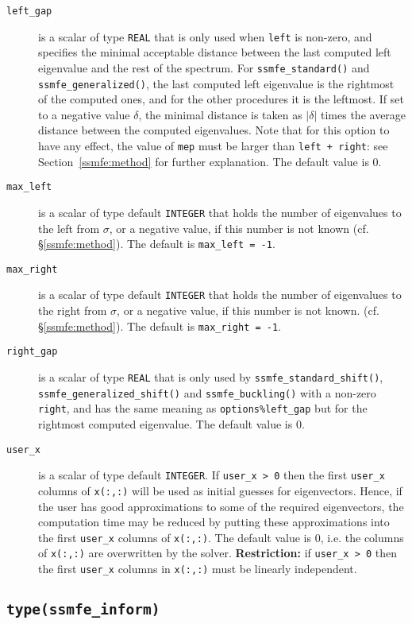 \begin{description}
%
\item[\texttt{left\_gap}]
is a scalar of type \texttt{REAL}
that is only used when
{\tt left} is non-zero, and
specifies the minimal acceptable distance
between the last computed left eigenvalue
and the rest of the spectrum.
For {\tt ssmfe\_standard()} and {\tt ssmfe\_generalized()},
the last computed left eigenvalue
is the rightmost of the computed ones,
and for the other procedures
it is the leftmost.
If set to a negative value $\delta$,
the minimal distance is taken as
$|\delta|$ times the average distance between the computed eigenvalues.
Note that for this option to have any effect,
the value of {\tt mep} must be larger than
{\tt left + right}: see Section~\ref{ssmfe:method}
for further explanation.
The default value is 0.
%
\item[\texttt{max\_left}]
is a scalar of type default \texttt{INTEGER} that
holds the number of eigenvalues to the left from $\sigma$,
or a negative value, if this number is not known
(cf. \S\ref{ssmfe:method}).
The default is {\tt max\_left = -1}.
%
\item[\texttt{max\_right}]
is a scalar of type default \texttt{INTEGER} that
holds the number of eigenvalues to the right from $\sigma$,
or a negative value, if this number is not known.
(cf. \S\ref{ssmfe:method}).
The default is {\tt max\_right = -1}.
%
\item[\texttt{right\_gap}]
is a scalar of type \texttt{REAL}
that is only used by 
{\tt ssmfe\_standard\_shift()}, {\tt ssmfe\_generalized\_shift()}
and {\tt ssmfe\_buckling()}
with a non-zero {\tt right}, and
has the same meaning as {\tt options\%left\_gap}
but for the rightmost computed eigenvalue.
The default value is 0.
%
\item[\texttt{user\_x}] is a scalar of type default \texttt{INTEGER}. 
If {\tt user\_x > 0} then the first {\tt user\_x} columns
of {\tt x(:,:)} will be used as initial guesses for eigenvectors.
Hence, if the user has good approximations
to some of the required eigenvectors, the computation time
may be reduced by putting these approximations
into the first {\tt user\_x} columns of {\tt x(:,:)}.
The default value is 0, 
i.e. the columns of {\tt x(:,:)} are overwritten by the solver.
{\bf Restriction:} if {\tt user\_x > 0} then
the first {\tt user\_x} columns in {\tt x(:,:)}
must be linearly independent.
%
\end{description}

\subsection{\texttt{type(ssmfe\_inform)}}


